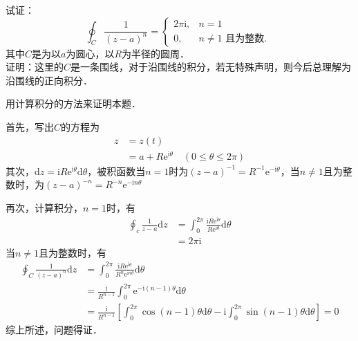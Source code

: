 \begin{example}{}
试证：
\begin{equation}
\oint_{C} \frac{1}{(z-a)^{n}}=\left\{\begin{array}{ll}2 \pi \mathrm{i}, & n=1 \\ 0, & n \neq 1 \text { 且为整数. }\end{array}\right.
\end{equation}
其中$C$是为以$a $为圆心，以$R $为半径的圆周．\\


证明：这里的$C $是一条围线，对于沿围线的积分，若无特殊声明，则今后总理解为沿围线的正向积分．

用计算积分的方法来证明本题．

首先，写出$C $的方程为
\begin{equation}
\begin{aligned} z &=z(t) \\ &=a+R \mathrm{e}^{\mathrm{i} \theta} \quad(0 \leqslant \theta \leqslant 2 \pi) \end{aligned}
\end{equation}
其次，$\mathrm{d} z=\mathrm{i} R \mathrm{e}^{\mathrm{i} \theta} \mathrm{d} \theta$，被积函数当$n =1$时为$(z-a)^{-1}=R^{-1} \mathrm{e}^{-\mathrm{i} \theta}$，当$n ≠ 1$且为整数时，为$(z-a)^{-n}=R^{-n} \mathrm{e}^{-\mathrm{i} n \theta}$

再次，计算积分，$n=1$时，有
\begin{equation}
\begin{aligned} \oint_{c} \frac{1}{z-a} \mathrm{d} z &=\int_{0}^{2 \pi} \frac{\mathrm{i} R \mathrm{e}^{\mathrm{i} \theta}}{R \mathrm{e}^{\mathrm{i} \theta}} \mathrm{d} \theta \\ &=2 \pi \mathrm{i} \end{aligned}
\end{equation}
当$n \neq 1$且为整数时，有
\begin{equation}
\begin{aligned} \oint_{C} \frac{1}{(z-a)^{n}} \mathrm{d} z &=\int_{0}^{2 \pi} \frac{\mathrm{i} R \mathrm{e}^{\mathrm{i} \theta}}{R^{n} \mathrm{e}^{\mathrm{i} n \theta}} \mathrm{d} \theta \\ &=\frac{\mathrm{i}}{R^{n-1}} \int_{0}^{2 \pi} \mathrm{e}^{-\mathrm{i}(n-1) \theta} \mathrm{d} \theta \\ &=\frac{\mathrm{i}}{R^{n-1}}\left[\int_{0}^{2 \pi} \cos (n-1) \theta \mathrm{d} \theta-\mathrm{i} \int_{0}^{2 \pi} \sin (n-1) \theta \mathrm{d} \theta\right]=0 \end{aligned}
\end{equation}
综上所述，问题得证．
\end{example}

